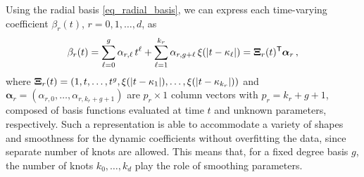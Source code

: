\documentclass[letterpaper,10pt,openany]{article}
\def\al{\alpha}\def\alv{\boldsymbol{\alpha}}
\def\be{\beta}\def\bev{\boldsymbol{\beta}}
\def\Xiv{\boldsymbol{\Xi}}
\def\trans{\text{\textsf{T}}}
\begin{document}
Using the radial basis \eqref{eq_radial_basis}, we can express each time-varying coefficient $\be_r(t)$, $r=0,1,\ldots,d$, as
\begin{equation}\label{eq_radial_basis_expansion}
\beta_r(t)=\sum_{\ell=0}^{g}\alpha_{r,\ell}\,t^\ell + \sum_{\ell=1}^{k_r} \alpha_{r,g+\ell}\,\xi(|t-\kappa_\ell|) = \Xiv_r(t)^{\trans}\alv_r\,,
\end{equation}
where 
$\Xiv_r(t) = \left(1, {\color{black} t,} \ldots, t^g, \xi(|t-\kappa_1|),\ldots,\xi(|t-\kappa_{k_r}|)\right)$
and 
$\alv_r = (\al_{r,0},\ldots,\al_{r,k_r+g+1})$ 
are $p_r\times 1$ column vectors with $p_r=k_r+g+1$, composed of basis functions evaluated at time $t$ and unknown parameters, respectively. Such a representation is able to accommodate a variety of shapes and smoothness for the dynamic coefficients without overfitting the data, since separate number of knots are allowed. This means that, for a fixed degree basis $g$, the number of knots $k_0,\ldots,k_d$ play the role of smoothing parameters. 
\end{document}
